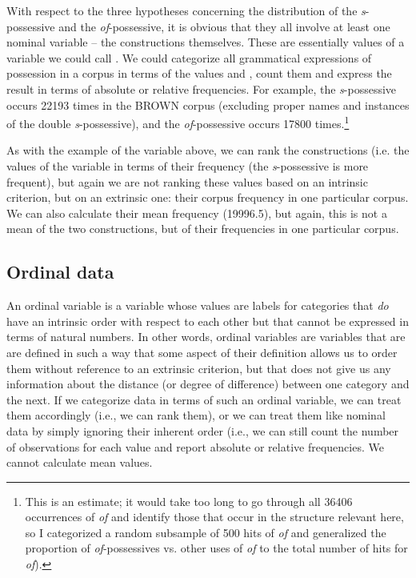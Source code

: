 With respect to the three hypotheses concerning the distribution of the \textit{s}-possessive and the \textit{of}-possessive, it is obvious that they all involve at least one nominal variable -- the constructions themselves. These are essentially values of a variable we could call . We could categorize all grammatical expressions of possession in a corpus in terms of the values  and , count them and express the result in terms of absolute or relative frequencies. For example, the \textit{s}-possessive occurs \num{22193} times in the BROWN corpus (excluding proper names and instances of the double \textit{s}-possessive), and the \textit{of}-possessive occurs \num{17800} times.\footnote{This is an estimate; it would take too long to go through all \num{36406} occurrences of \textit{of} and identify those that occur in the structure relevant here, so I categorized a random subsample of 500 hits of \textit{of} and generalized the proportion of \textit{of}-possessives vs. other uses of \textit{of} to the total number of hits for \textit{of}).}

As with the example of the variable  above, we can rank the constructions (i.e. the values of the variable  in terms of their frequency (the \textit{s}-possessive is more frequent), but again we are not ranking these values based on an intrinsic criterion, but on an extrinsic one: their corpus frequency in one particular corpus. We can also calculate their mean frequency (\num{19996.5}), but again, this is not a mean of the two constructions, but of their frequencies in one particular corpus.

\subsection{Ordinal data}
\label{sec:ordinaldata}

An ordinal variable is a variable whose values are labels for categories that \emph{do} have an intrinsic order with respect to each other but that cannot be expressed in terms of natural numbers. In other words, ordinal variables are variables that are are defined in such a way that some aspect of their definition allows us to order them without reference to an extrinsic criterion, but that does not give us any information about the distance (or degree of difference) between one category and the next. If we categorize data in terms of such an ordinal variable, we can treat them accordingly (i.e., we can rank them), or we can treat them like nominal data by simply ignoring their inherent order (i.e., we can still count the number of observations for each value and report absolute or relative frequencies. We cannot calculate mean values.


